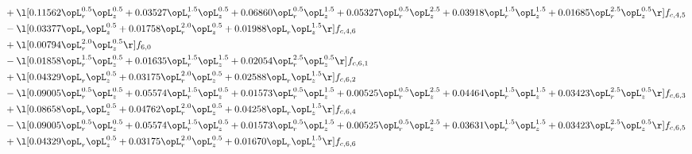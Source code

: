 \begin{alignat}{2}
& + \l[  0.11562 \opL_r^{0.5} \opL_z^{0.5} +  0.03527 \opL_r^{1.5} \opL_z^{0.5} +  0.06860 \opL_r^{0.5} \opL_z^{1.5} +  0.05327 \opL_r^{0.5} \opL_z^{2.5} +  0.03918 \opL_r^{1.5} \opL_z^{1.5} +  0.01685 \opL_r^{2.5} \opL_z^{0.5}  \r] f_{c,4,5} \nonumber \\ 
& - \l[  0.03377 \opL_r \opL_z^{0.5} +  0.01758 \opL_r^{2.0} \opL_z^{0.5} +  0.01988 \opL_r \opL_z^{1.5}  \r] f_{c,4,6} \nonumber \\ 
& + \l[  0.00794 \opL_r^{2.0} \opL_z^{0.5}  \r] f_{6,0} \nonumber \\ 
& - \l[  0.01858 \opL_r^{1.5} \opL_z^{0.5} +  0.01635 \opL_r^{1.5} \opL_z^{1.5} +  0.02054 \opL_r^{2.5} \opL_z^{0.5}  \r] f_{c,6,1} \nonumber \\ 
& + \l[  0.04329 \opL_r \opL_z^{0.5} +  0.03175 \opL_r^{2.0} \opL_z^{0.5} +  0.02588 \opL_r \opL_z^{1.5}  \r] f_{c,6,2} \nonumber \\ 
& - \l[  0.09005 \opL_r^{0.5} \opL_z^{0.5} +  0.05574 \opL_r^{1.5} \opL_z^{0.5} +  0.01573 \opL_r^{0.5} \opL_z^{1.5} +  0.00525 \opL_r^{0.5} \opL_z^{2.5} +  0.04464 \opL_r^{1.5} \opL_z^{1.5} +  0.03423 \opL_r^{2.5} \opL_z^{0.5}  \r] f_{c,6,3} \nonumber \\ 
& + \l[  0.08658 \opL_r \opL_z^{0.5} +  0.04762 \opL_r^{2.0} \opL_z^{0.5} +  0.04258 \opL_r \opL_z^{1.5}  \r] f_{c,6,4} \nonumber \\ 
& - \l[  0.09005 \opL_r^{0.5} \opL_z^{0.5} +  0.05574 \opL_r^{1.5} \opL_z^{0.5} +  0.01573 \opL_r^{0.5} \opL_z^{1.5} +  0.00525 \opL_r^{0.5} \opL_z^{2.5} +  0.03631 \opL_r^{1.5} \opL_z^{1.5} +  0.03423 \opL_r^{2.5} \opL_z^{0.5}  \r] f_{c,6,5} \nonumber \\ 
& + \l[  0.04329 \opL_r \opL_z^{0.5} +  0.03175 \opL_r^{2.0} \opL_z^{0.5} +  0.01670 \opL_r \opL_z^{1.5}  \r] f_{c,6,6} \nonumber \\ 
\end{alignat} 


